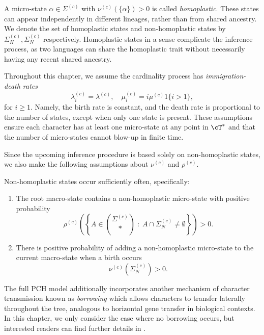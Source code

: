 A micro-state $\alpha \in \Sigma^{(c)}$ with $\nu^{(c)}(\{\alpha\}) > 0$ is called \textit{homoplastic}. These states
can appear independently in different lineages, rather than from shared ancestry. We denote the set of homoplastic states
and non-homoplastic states by $\Sigma_H^{(c)}, \Sigma_N^{(c)}$ respectively. Homoplastic states in a sense complicate the
inference process, as two languages can share the homoplastic trait without necessarily having any recent shared ancestry.

Throughout this chapter, we assume the cardinality process has \textit{immigration-death rates}
%
\begin{equation}
    \lambda_i^{(c)} = \lambda^{(c)}, \quad \mu_i^{(c)} = i \mu^{(c)} 1\{i > 1\},
\end{equation}
%
\noindent for $i \geq 1$. Namely, the birth rate is constant, and the death rate is proportional to the number of states,
except when only one state is present. These assumptions ensure each character
has at least one micro-state at any point in $\cT^*$ and that the number of micro-states
cannot blow-up in finite time.

Since the upcoming inference procedure is based solely on non-homoplastic states, we also make the
following assumptions about $\nu^{(c)}$ and $\rho^{(c)}$.

\begin{assumption}[1]
    Non-homoplastic states occur sufficiently often, specifically:
    \begin{enumerate}[label=(\roman*)]
        \item The root macro-state contains a non-homoplastic micro-state with positive probability
                \[\rho^{(c)} \left(\left\{A \in {\Sigma^{(c)} \choose *} \; : \; A \cap \Sigma^{(c)}_N \neq \emptyset \right\}\right) > 0.\]
        \item There is positive probability of adding a non-homoplastic micro-state to the current macro-state when a birth occurs
                \[\nu^{(c)}(\Sigma_N^{(c)}) > 0.\]
    \end{enumerate}
\end{assumption}

The full PCH model additionally incorporates another mechanism of character transmission known
as \textit{borrowing} which allows characters to transfer laterally throughout the tree, analogous to
horizontal gene transfer in biological contexts. In this chapter, we only consider the case where no borrowing
occurs, but interested readers can find further details in \cite{canby2024_polymorphism_linguistic_phylogenetics}.


